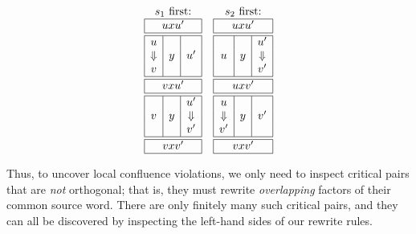 \documentclass[../generics]{subfiles}
\begin{document}
\begin{ceqn}
\[
\begin{array}{cc}
\text{$s_1$ first:}&
\text{$s_2$ first:}\\
\begin{array}{|c|c|c|}
\hline
\multicolumn{3}{|c|}{uxu'}\\
\hline
\hline
u&&\\
\Downarrow&y&u'\\
v&&\\
\hline
\hline
\multicolumn{3}{|c|}{vxu'}\\
\hline
\hline
&&u'\\
v&y&\Downarrow\\
&&v'\\
\hline
\hline
\multicolumn{3}{|c|}{vxv'}\\
\hline
\end{array}
&
\begin{array}{|c|c|c|}
\hline
\multicolumn{3}{|c|}{uxu'}\\
\hline
\hline
&&u'\\
u&y&\Downarrow\\
&&v'\\
\hline
\hline
\multicolumn{3}{|c|}{uxv'}\\
\hline
\hline
u&&\\
\Downarrow&y&v'\\
v'&&\\
\hline
\hline
\multicolumn{3}{|c|}{vxv'}\\
\hline
\end{array}
\end{array}
\]
\end{ceqn}

Thus, to uncover local confluence violations, we only need to inspect critical pairs that are \emph{not} orthogonal; that is, they must rewrite \emph{overlapping} factors of their common source word. There are only finitely many such critical pairs, and they can all be discovered by inspecting the left-hand sides of our rewrite rules.
\end{document}
